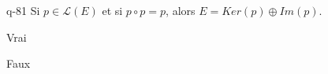 \begin{truefalse}{q-81}
Si $p\in \mathcal{L}(E)$ et si $p\circ p=p$, alors $E=Ker(p)\oplus Im(p)$.
\item* Vrai
\item Faux
\end{truefalse}

